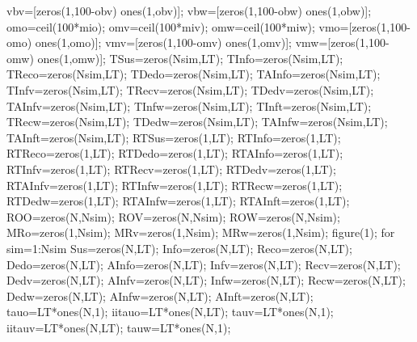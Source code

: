 vbv=[zeros(1,100-obv) ones(1,obv)];                                                                
vbw=[zeros(1,100-obw) ones(1,obw)];
omo=ceil(100*mio);
omv=ceil(100*miv);
omw=ceil(100*miw);
vmo=[zeros(1,100-omo) ones(1,omo)];
vmv=[zeros(1,100-omv) ones(1,omv)];
vmw=[zeros(1,100-omw) ones(1,omw)];
                TSus=zeros(Nsim,LT);
                TInfo=zeros(Nsim,LT);
                TReco=zeros(Nsim,LT);
                TDedo=zeros(Nsim,LT);
                TAInfo=zeros(Nsim,LT);
                TInfv=zeros(Nsim,LT);
                TRecv=zeros(Nsim,LT);
                TDedv=zeros(Nsim,LT);
                TAInfv=zeros(Nsim,LT);
                TInfw=zeros(Nsim,LT);
                TInft=zeros(Nsim,LT);
                TRecw=zeros(Nsim,LT);
                TDedw=zeros(Nsim,LT);
                TAInfw=zeros(Nsim,LT);
                TAInft=zeros(Nsim,LT);
                RTSus=zeros(1,LT);
                RTInfo=zeros(1,LT);
                RTReco=zeros(1,LT);
                RTDedo=zeros(1,LT);
                RTAInfo=zeros(1,LT);
                RTInfv=zeros(1,LT);
                RTRecv=zeros(1,LT);
                RTDedv=zeros(1,LT);
                RTAInfv=zeros(1,LT); 
                RTInfw=zeros(1,LT);
                RTRecw=zeros(1,LT);
                RTDedw=zeros(1,LT);
                RTAInfw=zeros(1,LT);  
                RTAInft=zeros(1,LT);    
                ROO=zeros(N,Nsim);
                ROV=zeros(N,Nsim);
                ROW=zeros(N,Nsim); 
                MRo=zeros(1,Nsim);
                MRv=zeros(1,Nsim);
                MRw=zeros(1,Nsim);
figure(1);
for sim=1:Nsim              
                Sus=zeros(N,LT);
                Info=zeros(N,LT);
                Reco=zeros(N,LT);
                Dedo=zeros(N,LT);
                AInfo=zeros(N,LT);
                Infv=zeros(N,LT);
                Recv=zeros(N,LT);
                Dedv=zeros(N,LT);
                AInfv=zeros(N,LT); 
                Infw=zeros(N,LT);
                Recw=zeros(N,LT);
                Dedw=zeros(N,LT);
                AInfw=zeros(N,LT);  
                AInft=zeros(N,LT);    %
                tauo=LT*ones(N,1);
                iitauo=LT*ones(N,LT);              
                tauv=LT*ones(N,1);
                iitauv=LT*ones(N,LT);  
                tauw=LT*ones(N,1);
